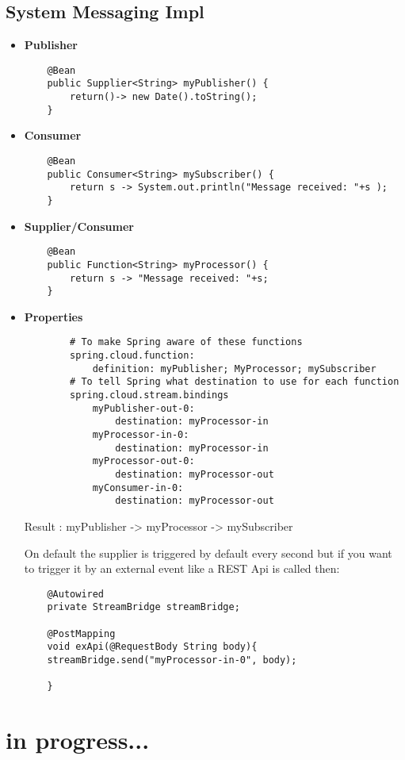 \documentclass[a4paper, 12pt]{article}
\begin{document}
    \subsection{System Messaging Impl}
    \begin{itemize}
        \item \textbf{Publisher}
        \begin{lstlisting}
    @Bean
    public Supplier<String> myPublisher() {
        return()-> new Date().toString();
    }
        \end{lstlisting}
        \item \textbf{Consumer}
        \begin{lstlisting}
    @Bean
    public Consumer<String> mySubscriber() {
        return s -> System.out.println("Message received: "+s );
    }
        \end{lstlisting}
        \item \textbf{Supplier/Consumer}
        \begin{lstlisting}
    @Bean
    public Function<String> myProcessor() {
        return s -> "Message received: "+s;
    }
        \end{lstlisting}

        \item \textbf{Properties}
        \begin{lstlisting}
        # To make Spring aware of these functions
        spring.cloud.function:
            definition: myPublisher; MyProcessor; mySubscriber
        # To tell Spring what destination to use for each function
        spring.cloud.stream.bindings
            myPublisher-out-0:
                destination: myProcessor-in
            myProcessor-in-0:
                destination: myProcessor-in
            myProcessor-out-0:
                destination: myProcessor-out
            myConsumer-in-0:
                destination: myProcessor-out
        \end{lstlisting}
        Result : myPublisher -> myProcessor -> mySubscriber

        On default the supplier is triggered by default every second but if you want to trigger it by an external event like a REST Api is called then:
        \begin{lstlisting}
    @Autowired
    private StreamBridge streamBridge;

    @PostMapping
    void exApi(@RequestBody String body){
    streamBridge.send("myProcessor-in-0", body);

    }
        \end{lstlisting}
    \end{itemize}


    \section{in progress...}
\end{document}
